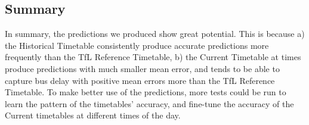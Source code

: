 \subsection{Summary}
\par In summary, the predictions we produced show great potential. This is because a) the Historical Timetable consistently produce accurate predictions more frequently than the TfL Reference Timetable, b) the Current Timetable at times produce predictions with much smaller mean error, and tends to be able to capture bus delay with positive mean errors more than the TfL Reference Timetable. To make better use of the predictions, more tests could be run to learn the pattern of the timetables' accuracy, and fine-tune the accuracy of the Current timetables at different times of the day.
